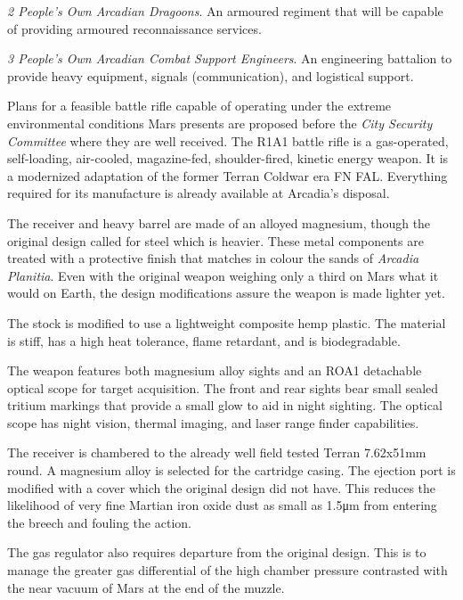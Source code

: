 \item {\it 2 People's Own Arcadian Dragoons}. An armoured regiment that will be capable of providing armoured reconnaissance services.

\item {\it 3 People's Own Arcadian Combat Support Engineers}. An engineering battalion to provide heavy equipment, signals (communication), and logistical support.
\stopitemize
\StopTimelineDate

Plans for a feasible battle rifle capable of operating under the extreme environmental conditions Mars presents are proposed before the {\it City Security Committee} where they are well received. The R1A1 battle rifle is a gas-operated, self-loading, air-cooled, magazine-fed, shoulder-fired, kinetic energy weapon. It is a modernized adaptation of the former Terran Coldwar era FN FAL. Everything required for its manufacture is already available at Arcadia's disposal.

The receiver and heavy barrel are made of an alloyed magnesium, though the original design called for steel which is heavier. These metal components are treated with a protective finish that matches in colour the sands of {\it Arcadia Planitia}. Even with the original weapon weighing only a third on Mars what it would on Earth, the design modifications assure the weapon is made lighter yet.

The stock is modified to use a lightweight composite hemp plastic. The material is stiff, has a high heat tolerance, flame retardant, and is biodegradable.

The weapon features both magnesium alloy sights and an ROA1 detachable optical scope for target acquisition. The front and rear sights bear small sealed tritium markings that provide a small glow to aid in night sighting. The optical scope has night vision, thermal imaging, and laser range finder capabilities.

The receiver is chambered to the already well field tested Terran 7.62x51mm round. A magnesium alloy is selected for the cartridge casing. The ejection port is modified with a cover which the original design did not have. This reduces the likelihood of very fine Martian iron oxide dust as small as 1.5μm from entering the breech and fouling the action.

The gas regulator also requires departure from the original design. This is to manage the greater gas differential of the high chamber pressure contrasted with the near vacuum of Mars at the end of the muzzle.

